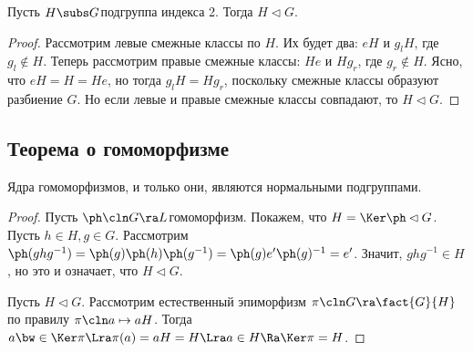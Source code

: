 \documentclass[a4paper]{article}
\newcommand{\kph}{\Ker \ph}
\begin{document}
\begin{theorem}
Пусть $H\subs G$\т подгруппа индекса 2. Тогда $H \lhd G$.
\end{theorem}
\begin{proof}
Рассмотрим левые смежные классы по $H$. Их будет два: $eH$ и $g_lH$, где $g_l \notin H$.
Теперь рассмотрим правые смежные классы: $He$ и $Hg_r$, где $g_r \notin H$. Ясно,
что $eH=H=He$, но тогда $g_lH=Hg_r$, поскольку смежные классы образуют разбиение $G$. Но
если левые и правые смежные классы совпадают, то $H \lhd G$.
\end{proof}

\subsection{Теорема о гомоморфизме}

\begin{theorem}
Ядра гомоморфизмов, и только они, являются нормальными подгруппами.
\end{theorem}
\begin{proof}
 Пусть $\ph\cln G\ra L$\т гомоморфизм. Покажем, что $H=\kph \lhd G$.  Пусть $h \in H, g \in G$. Рассмотрим
$\ph(ghg^{-1})=\ph(g)\ph(h)\ph(g^{-1})= \ph(g)e'\ph(g)^{-1}=e'$. Значит, $ghg^{-1} \in H$, но это и означает,
что $H \lhd G$.

 Пусть $H \lhd G$. Рассмотрим естественный эпиморфизм  $\pi\cln G \ra \fact{G}{H}$ по правилу
$\pi\cln a \mapsto aH$. Тогда $a \bw\in \Ker \pi \Lra \pi(a)=aH=H \Lra a \in H \Ra \Ker \pi = H$.
\end{proof}
\end{document}
